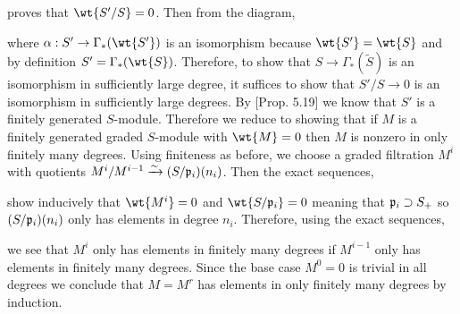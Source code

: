 \documentclass[12pt]{article}
\begin{document}
\begin{enumerate}
\begin{center}
\end{center}
proves that $\wt{S'/S} = 0$. Then from the diagram,
\begin{center}
\end{center}
where $\alpha : S' \to \Gamma_*(\wt{S'})$ is an isomorphism because $\wt{S'} = \wt{S}$ and by definition $S' = \Gamma_*(\wt{S})$. Therefore, to show that $S \to \Gamma_*(\tilde{S})$ is an isomorphism in sufficiently large degree, it suffices to show that $S'/S \to 0$ is an isomorphism in sufficiently large degrees. By [Prop. 5.19] we know that $S'$ is a finitely generated $S$-module. Therefore we reduce to showing that if $M$ is a finitely generated graded $S$-module with $\wt{M} = 0$ then $M$ is nonzero in only finitely many degrees. Using finiteness as before, we choose a graded filtration $M^i$ with quotients $M^{i} / M^{i-1} \xrightarrow{\sim} (S / \mathfrak{p}_i)(n_i)$. Then the exact sequences,
\begin{center}
\end{center}
show inducively that $\wt{M^i} = 0$ and $\wt{S/\p_i} = 0$ meaning that $\mathfrak{p}_i \supset S_+$ so $(S/\mathfrak{p}_i)(n_i)$ only has elements in degree $n_i$. Therefore, using the exact sequences,
\begin{center}
\end{center} 
we see that $M^{i}$ only has elements in finitely many degrees if $M^{i-1}$ only has elements in finitely many degrees.
Since the base case $M^0 = 0$ is trivial in all degrees we conclude that $M = M^r$ has elements in only finitely many degrees by induction.


\end{enumerate}
\end{document}

